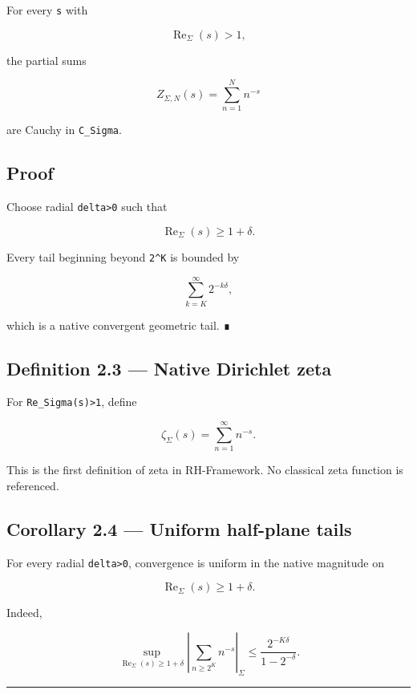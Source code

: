 For every \texttt{s} with

\[
\operatorname{Re}_\Sigma(s)>1,
\]

the partial sums

\[
Z_{\Sigma,N}(s)=\sum_{n=1}^{N}n^{-s}
\]

are Cauchy in \texttt{C\_Sigma}.

\hypertarget{proof-3}{%
\subsection{Proof}\label{proof-3}}

Choose radial \texttt{delta\textgreater{}0} such that

\[
\operatorname{Re}_\Sigma(s)\ge1+\delta.
\]

Every tail beginning beyond \texttt{2\^{}K} is bounded by

\[
\sum_{k=K}^{\infty}2^{-k\delta},
\]

which is a native convergent geometric tail. ∎

\hypertarget{definition-2.3-native-dirichlet-zeta}{%
\subsection{Definition 2.3 --- Native Dirichlet zeta}\label{definition-2.3-native-dirichlet-zeta}}

For \texttt{Re\_Sigma(s)\textgreater{}1}, define

\[
\boxed{
\zeta_\Sigma(s)
=
\sum_{n=1}^{\infty}n^{-s}.
}
\]

This is the first definition of zeta in RH-Framework. No classical zeta
function is referenced.

\hypertarget{corollary-2.4-uniform-half-plane-tails}{%
\subsection{Corollary 2.4 --- Uniform half-plane tails}\label{corollary-2.4-uniform-half-plane-tails}}

For every radial \texttt{delta\textgreater{}0}, convergence is uniform in the native magnitude on

\[
\operatorname{Re}_\Sigma(s)\ge1+\delta.
\]

Indeed,

\[
\sup_{\operatorname{Re}_\Sigma(s)\ge1+\delta}
\left|
\sum_{n\ge2^K}n^{-s}
\right|_\Sigma
\le
\frac{2^{-K\delta}}{1-2^{-\delta}}.
\]

\begin{center}\rule{0.5\linewidth}{0.5pt}\end{center}


